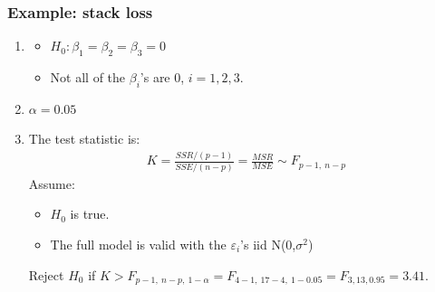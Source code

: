 \documentclass[handout]{beamer}\usepackage[]{graphicx}\usepackage[]{color}
\providecommand{\e}{\varepsilon}
\numberwithin{equation}{section}
\begin{document}
\begin{frame}
\frametitle{Example: stack loss}
\begin{enumerate}[1. ]
\item 
\begin{itemize}
\item $H_0: \beta_1 = \beta_2 = \beta_3 = 0$
\pause \item Not all of the $\beta_i$'s are 0, $i = 1, 2, 3$.
\end{itemize}
\pause \item $\alpha = 0.05$
\pause \item The test statistic is:
\begin{align*}
K = \frac{SSR/(p-1)}{SSE/(n-p)} = \frac{MSR}{MSE}  \sim F_{p - 1, \ n - p}
\end{align*}
\pause Assume:
\begin{itemize}
\pause \item $H_0$ is true.
\pause \item The full model is valid with the $\e_i$'s iid N(0,$\sigma^2$)
\end{itemize}
Reject $H_0$ if $K > F_{p - 1,\ n - p,\ 1 - \alpha} = F_{4 - 1,\ 17 - 4,\ 1 - 0.05}  = F_{3, 13, 0.95} = 3.41$.
\end{enumerate}
\end{frame}
\end{document}
